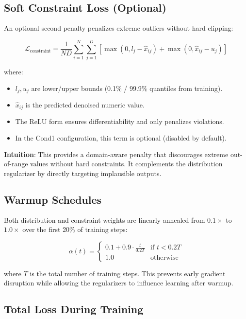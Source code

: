 \documentclass{article}
\begin{document}
\subsection{Soft Constraint Loss (Optional)}

An optional second penalty penalizes extreme outliers without hard clipping:

\begin{equation}
\mathcal{L}_{\text{constraint}} = \frac{1}{ND} \sum_{i=1}^{N} \sum_{j=1}^{D} \left[ \max(0, l_j - \hat{x}_{ij}) + \max(0, \hat{x}_{ij} - u_j) \right]
\end{equation}

where:
\begin{itemize}
  \item $l_j, u_j$ are lower/upper bounds (0.1\% / 99.9\% quantiles from training).
  \item $\hat{x}_{ij}$ is the predicted denoised numeric value.
  \item The ReLU form ensures differentiability and only penalizes violations.
  \item In the Cond1 configuration, this term is optional (disabled by default).
\end{itemize}

\textbf{Intuition}: This provides a domain-aware penalty that discourages extreme out-of-range values without hard constraints. It complements the distribution regularizer by directly targeting implausible outputs.

\subsection{Warmup Schedules}

Both distribution and constraint weights are linearly annealed from $0.1 \times$ to $1.0 \times$ over the first 20\% of training steps:

\begin{equation}
\alpha(t) = \begin{cases}
0.1 + 0.9 \cdot \frac{t}{0.2 T} & \text{if } t < 0.2T \\
1.0 & \text{otherwise}
\end{cases}
\end{equation}

where $T$ is the total number of training steps. This prevents early gradient disruption while allowing the regularizers to influence learning after warmup.

\subsection{Total Loss During Training}
\end{document}
